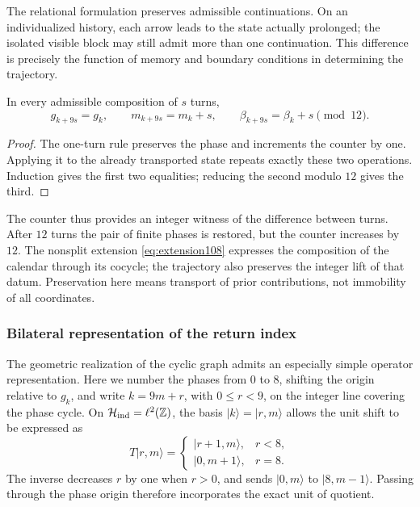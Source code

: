 The relational formulation preserves admissible continuations. On
an individualized history, each arrow leads to the state actually
prolonged; the isolated visible block may still admit more than one
continuation. This difference is precisely the function of memory and
boundary conditions in determining the trajectory.

\begin{proposition}
\label{mono-ampl:vueltas}
In every admissible composition of \(s\) turns,
\[
 g_{k+9s}=g_k,\qquad m_{k+9s}=m_k+s,\qquad
 \beta_{k+9s}=\beta_k+s\pmod{12}.
\]
\end{proposition}
\begin{proof}
The one-turn rule preserves the phase and increments the counter by one.
Applying it to the already transported state repeats exactly these
two operations. Induction gives the first two equalities; reducing the
second modulo \(12\) gives the third.
\end{proof}

The counter thus provides an integer witness of the difference between
turns. After \(12\) turns the pair of finite phases is restored, but
the counter increases by \(12\). The nonsplit extension
\eqref{eq:extension108} expresses the composition of the calendar through its
cocycle; the trajectory also preserves the integer lift of that datum.
Preservation here means transport of prior contributions,
not immobility of all coordinates.

\subsubsection{Bilateral representation of the return index}

The geometric realization of the cyclic graph admits an especially simple
operator representation. Here we number the phases from \(0\) to
\(8\), shifting the origin relative to \(g_k\), and
write \(k=9m+r\), with \(0\leq r<9\), on the integer line
covering the phase cycle. On
\(\mathcal H_{\rm ind}=\ell^2(\mathbb Z)\), the basis
\(|k\rangle=|r,m\rangle\) allows the unit shift to be expressed as
\[
 T|r,m\rangle=
 \begin{cases}
 |r+1,m\rangle,&r<8,\\
 |0,m+1\rangle,&r=8.
 \end{cases}
\]
The inverse decreases \(r\) by one when \(r>0\), and sends
\(|0,m\rangle\) to \(|8,m-1\rangle\). Passing through the phase origin
therefore incorporates the exact unit of quotient.

